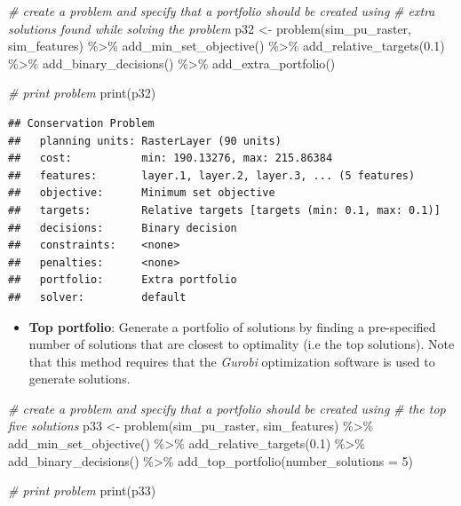 \documentclass[
  12pt,
]{book}
\newenvironment{Shaded}{\begin{snugshade}}{\end{snugshade}}
\newcommand{\AttributeTok}[1]{\textcolor[rgb]{0.77,0.63,0.00}{#1}}
\newcommand{\CommentTok}[1]{\textcolor[rgb]{0.56,0.35,0.01}{\textit{#1}}}
\newcommand{\DecValTok}[1]{\textcolor[rgb]{0.00,0.00,0.81}{#1}}
\newcommand{\FloatTok}[1]{\textcolor[rgb]{0.00,0.00,0.81}{#1}}
\newcommand{\FunctionTok}[1]{\textcolor[rgb]{0.00,0.00,0.00}{#1}}
\newcommand{\NormalTok}[1]{#1}
\newcommand{\OtherTok}[1]{\textcolor[rgb]{0.56,0.35,0.01}{#1}}
\newcommand{\SpecialCharTok}[1]{\textcolor[rgb]{0.00,0.00,0.00}{#1}}
\providecommand{\tightlist}{%
  \setlength{\itemsep}{0pt}\setlength{\parskip}{0pt}}
\begin{document}
\begin{Shaded}
\begin{Highlighting}[]
\CommentTok{\# create a problem and specify that a portfolio should be created using}
\CommentTok{\# extra solutions found while solving the problem}
\NormalTok{p32 }\OtherTok{\textless{}{-}} \FunctionTok{problem}\NormalTok{(sim\_pu\_raster, sim\_features) }\SpecialCharTok{\%\textgreater{}\%}
       \FunctionTok{add\_min\_set\_objective}\NormalTok{() }\SpecialCharTok{\%\textgreater{}\%}
       \FunctionTok{add\_relative\_targets}\NormalTok{(}\FloatTok{0.1}\NormalTok{) }\SpecialCharTok{\%\textgreater{}\%}
       \FunctionTok{add\_binary\_decisions}\NormalTok{() }\SpecialCharTok{\%\textgreater{}\%}
       \FunctionTok{add\_extra\_portfolio}\NormalTok{()}

\CommentTok{\# print problem}
\FunctionTok{print}\NormalTok{(p32)}
\end{Highlighting}
\end{Shaded}

\begin{verbatim}
## Conservation Problem
##   planning units: RasterLayer (90 units)
##   cost:           min: 190.13276, max: 215.86384
##   features:       layer.1, layer.2, layer.3, ... (5 features)
##   objective:      Minimum set objective 
##   targets:        Relative targets [targets (min: 0.1, max: 0.1)]
##   decisions:      Binary decision 
##   constraints:    <none>
##   penalties:      <none>
##   portfolio:      Extra portfolio
##   solver:         default
\end{verbatim}

\begin{itemize}
\tightlist
\item
  \textbf{Top portfolio}: Generate a portfolio of solutions by finding a pre-specified number of solutions that are closest to optimality (i.e the top solutions). Note that this method requires that the \emph{Gurobi} optimization software is used to generate solutions.
\end{itemize}

\begin{Shaded}
\begin{Highlighting}[]
\CommentTok{\# create a problem and specify that a portfolio should be created using}
\CommentTok{\# the top five solutions}
\NormalTok{p33 }\OtherTok{\textless{}{-}} \FunctionTok{problem}\NormalTok{(sim\_pu\_raster, sim\_features) }\SpecialCharTok{\%\textgreater{}\%}
       \FunctionTok{add\_min\_set\_objective}\NormalTok{() }\SpecialCharTok{\%\textgreater{}\%}
       \FunctionTok{add\_relative\_targets}\NormalTok{(}\FloatTok{0.1}\NormalTok{) }\SpecialCharTok{\%\textgreater{}\%}
       \FunctionTok{add\_binary\_decisions}\NormalTok{() }\SpecialCharTok{\%\textgreater{}\%}
       \FunctionTok{add\_top\_portfolio}\NormalTok{(}\AttributeTok{number\_solutions =} \DecValTok{5}\NormalTok{)}

\CommentTok{\# print problem}
\FunctionTok{print}\NormalTok{(p33)}
\end{Highlighting}
\end{Shaded}
\end{document}
